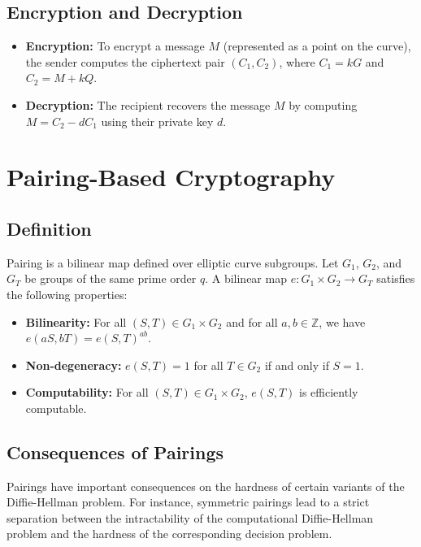 \documentclass[12pt]{article}
\begin{document}
\subsection{Encryption and Decryption}
\begin{itemize}
    \item \textbf{Encryption:} To encrypt a message \( M \) (represented as a point on the curve), the sender computes the ciphertext pair \( (C_1, C_2) \), where \( C_1 = kG \) and \( C_2 = M + kQ \).
    \item \textbf{Decryption:} The recipient recovers the message \( M \) by computing \( M = C_2 - dC_1 \) using their private key \( d \).
\end{itemize}

\newpage
\section{Pairing-Based Cryptography}

\subsection{Definition}
Pairing is a bilinear map defined over elliptic curve subgroups. Let \( G_1 \), \( G_2 \), and \( G_T \) be groups of the same prime order \( q \). A bilinear map \( e: G_1 \times G_2 \to G_T \) satisfies the following properties:
\begin{itemize}
    \item \textbf{Bilinearity:} For all \( (S, T) \in G_1 \times G_2 \) and for all \( a, b \in \mathbb{Z} \), we have \( e(aS, bT) = e(S, T)^{ab} \).
    \item \textbf{Non-degeneracy:} \( e(S, T) = 1 \) for all \( T \in G_2 \) if and only if \( S = 1 \).
    \item \textbf{Computability:} For all \( (S, T) \in G_1 \times G_2 \), \( e(S, T) \) is efficiently computable.
\end{itemize}

\subsection{Consequences of Pairings}
Pairings have important consequences on the hardness of certain variants of the Diffie-Hellman problem. For instance, symmetric pairings lead to a strict separation between the intractability of the computational Diffie-Hellman problem and the hardness of the corresponding decision problem.
\end{document}
